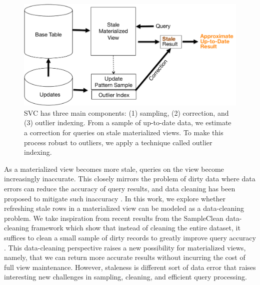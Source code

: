 \begin{figure}[t]\vspace{-1.5em}
\centering
 \includegraphics[scale=0.30]{figs/sys-arch.pdf}
 \caption{SVC has three main components: (1) sampling, (2) correction, and (3) outlier indexing. From a sample of up-to-date data, we estimate
 a correction for queries on stale materialized views. To make this process robust to outliers, we apply a technique called outlier indexing. \label{sys-arch}}\vspace{-1.5em}
\end{figure}

As a materialized view becomes more stale, queries on the view become increasingly inaccurate.
This closely mirrors the problem of dirty data where data errors can reduce the accuracy of query results, and data cleaning has been proposed to mitigate such inaccuracy \cite{rahm2000data}.
In this work, we explore whether refreshing stale rows in a materialized view can be modeled as a data-cleaning problem.
We take inspiration from recent results from the SampleClean data-cleaning framework which show that instead of cleaning the entire dataset,
it suffices to clean a small sample of dirty records to greatly improve query accuracy \cite{wang1999sample}.
This data-cleaning perspective raises a new possibility for materialized views, namely, that we can return more accurate results without incurring the cost of full view maintenance.
However, staleness is different sort of data error that raises interesting new challenges in sampling, cleaning, and efficient query processing.



